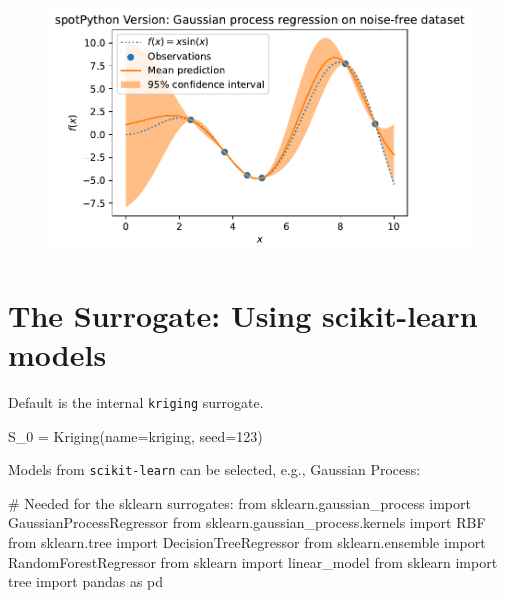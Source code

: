 \documentclass[
  letterpaper,
  DIV=11,
  numbers=noendperiod]{scrreprt}
\newenvironment{Shaded}{\begin{snugshade}}{\end{snugshade}}
\newcommand{\CommentTok}[1]{\textcolor[rgb]{0.37,0.37,0.37}{#1}}
\newcommand{\DecValTok}[1]{\textcolor[rgb]{0.68,0.00,0.00}{#1}}
\newcommand{\ImportTok}[1]{\textcolor[rgb]{0.00,0.46,0.62}{#1}}
\newcommand{\NormalTok}[1]{\textcolor[rgb]{0.00,0.23,0.31}{#1}}
\newcommand{\OperatorTok}[1]{\textcolor[rgb]{0.37,0.37,0.37}{#1}}
\newcommand{\StringTok}[1]{\textcolor[rgb]{0.13,0.47,0.30}{#1}}
\begin{document}
\begin{figure}[H]

{\centering \includegraphics{07_spot_ei_files/figure-pdf/cell-26-output-1.pdf}

}

\end{figure}

\hypertarget{the-surrogate-using-scikit-learn-models}{%
\section{The Surrogate: Using scikit-learn
models}\label{the-surrogate-using-scikit-learn-models}}

Default is the internal \texttt{kriging} surrogate.

\begin{Shaded}
\begin{Highlighting}[]
\NormalTok{S\_0 }\OperatorTok{=}\NormalTok{ Kriging(name}\OperatorTok{=}\StringTok{\textquotesingle{}kriging\textquotesingle{}}\NormalTok{, seed}\OperatorTok{=}\DecValTok{123}\NormalTok{)}
\end{Highlighting}
\end{Shaded}

Models from \texttt{scikit-learn} can be selected, e.g., Gaussian
Process:

\begin{Shaded}
\begin{Highlighting}[]
\CommentTok{\# Needed for the sklearn surrogates:}
\ImportTok{from}\NormalTok{ sklearn.gaussian\_process }\ImportTok{import}\NormalTok{ GaussianProcessRegressor}
\ImportTok{from}\NormalTok{ sklearn.gaussian\_process.kernels }\ImportTok{import}\NormalTok{ RBF}
\ImportTok{from}\NormalTok{ sklearn.tree }\ImportTok{import}\NormalTok{ DecisionTreeRegressor}
\ImportTok{from}\NormalTok{ sklearn.ensemble }\ImportTok{import}\NormalTok{ RandomForestRegressor}
\ImportTok{from}\NormalTok{ sklearn }\ImportTok{import}\NormalTok{ linear\_model}
\ImportTok{from}\NormalTok{ sklearn }\ImportTok{import}\NormalTok{ tree}
\ImportTok{import}\NormalTok{ pandas }\ImportTok{as}\NormalTok{ pd}
\end{Highlighting}
\end{Shaded}
\end{document}
